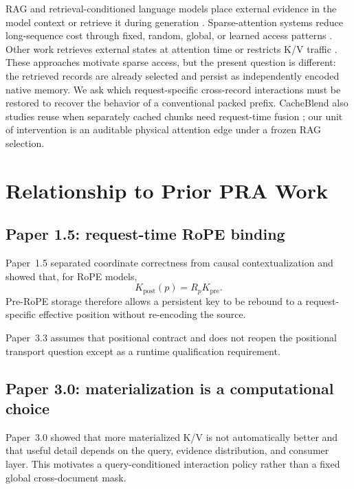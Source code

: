 \documentclass[11pt]{article}
\begin{document}
RAG and retrieval-conditioned language models place external evidence in the
model context or retrieve it during generation
\cite{lewis2020rag,guu2020realm,borgeaud2022retro}. Sparse-attention systems
reduce long-sequence cost through fixed, random, global, or learned access
patterns \cite{beltagy2020longformer,zaheer2020bigbird,roy2021routing}. Other
work retrieves external states at attention time or restricts K/V traffic
\cite{bertsch2023unlimiformer,tang2024quest,liu2025retrievalattention}. These
approaches motivate sparse access, but the present question is different: the
retrieved records are already selected and persist as independently encoded
native memory. We ask which request-specific cross-record interactions must be
restored to recover the behavior of a conventional packed prefix. CacheBlend
also studies reuse when separately cached chunks need request-time fusion
\cite{yao2024cacheblend}; our unit of intervention is an auditable physical
attention edge under a frozen RAG selection.

\section{Relationship to Prior PRA Work}

\subsection{Paper 1.5: request-time RoPE binding}

Paper~1.5 separated coordinate correctness from causal contextualization and
showed that, for RoPE models,
\[
K_{\mathrm{post}}(p)=R_pK_{\mathrm{pre}}.
\]
Pre-RoPE storage therefore allows a persistent key to be rebound to a
request-specific effective position without re-encoding the source.

Paper~3.3 assumes that positional contract and does not reopen the positional
transport question except as a runtime qualification requirement.

\subsection{Paper 3.0: materialization is a computational choice}

Paper~3.0 showed that more materialized K/V is not automatically better and
that useful detail depends on the query, evidence distribution, and consumer
layer. This motivates a query-conditioned interaction policy rather than a fixed
global cross-document mask.
\end{document}
